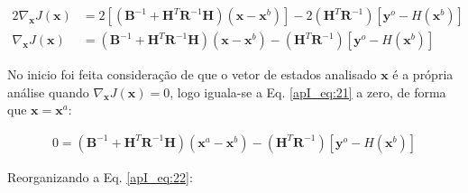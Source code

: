 

\begin{align}
  \label{apI_eq:20}
    2\nabla_{\mathbf{x}}{J(\mathbf{x})} & = 2[(\mathbf{B}^{-1} + \mathbf{H}^{T}\mathbf{R}^{-1}\mathbf{H})(\mathbf{x} - \mathbf{x}^{b})] - 2{(\mathbf{H}^{T}\mathbf{R}^{-1})[\mathbf{y}^{o} - \textit{H}(\mathbf{x}^{b})]} \\
  \label{apI_eq:21}
    \nabla_{\mathbf{x}}{J(\mathbf{x})} & = (\mathbf{B}^{-1} + \mathbf{H}^{T}\mathbf{R}^{-1}\mathbf{H})(\mathbf{x} - \mathbf{x}^{b}) - (\mathbf{H}^{T}\mathbf{R}^{-1})[\mathbf{y}^{o} - \textit{H}(\mathbf{x}^{b})]
\end{align}

No inicio foi feita consideração de que o vetor de estados analisado $\mathbf{x}$ é a própria análise quando $\nabla_{\mathbf{x}}{J(\mathbf{x})} = 0$, logo iguala-se a Eq. \ref{apI_eq:21} a zero, de forma que $\mathbf{x} = \mathbf{x}^{a}$:

\begin{equation}
  \label{apI_eq:22}
  \begin{split}
    0 = (\mathbf{B}^{-1} + \mathbf{H}^{T}\mathbf{R}^{-1}\mathbf{H})(\mathbf{x}^{a} - \mathbf{x}^{b}) - (\mathbf{H}^{T}\mathbf{R}^{-1})[\mathbf{y}^{o} - \textit{H}(\mathbf{x}^{b})]
  \end{split}  
\end{equation}

Reorganizando a Eq. \ref{apI_eq:22}:



